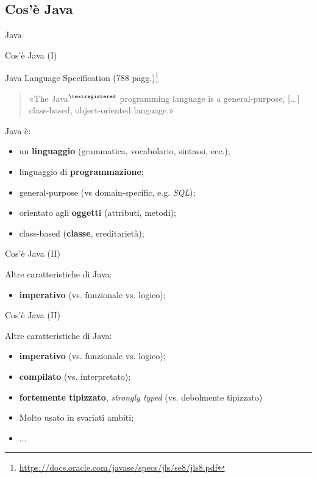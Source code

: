 \subsection[Cos'è Java]{Cos'è Java}

\begin{frame}{Java}
 
  \begin{center}
  \end{center}
  
\end{frame}

\begin{frame}{Cos'è Java (I)}
  
  Java Language Specification (788 pagg.)\footnote{\url{https://docs.oracle.com/javase/specs/jls/se8/jls8.pdf}}
  \begin{quote}
   «The Java$^{\textregistered}$  programming  language is a general-purpose, [...] 
    class-based,  object-oriented  language.»
  \end{quote}

  Java è:
  \begin{itemize}
    \item un \textbf{linguaggio} (grammatica, vocabolario, sintassi, ecc.);
    \item linguaggio di \textbf{programmazione};
    \item general-purpose (vs domain-specific, e.g. \textit{SQL});
    \item orientato agli \textbf{oggetti} (attributi, metodi);
    \item class-based (\textbf{classe}, ereditarietà);
  \end{itemize}

\end{frame}

\begin{frame}{Cos'è Java (II)}
  
  Altre caratteristiche di Java:
  \begin{itemize}
    \item \textbf{imperativo} (vs. funzionale vs. logico);
  \end{itemize}
\end{frame}

{
  
}

\begin{frame}{Cos'è Java (II)}
  
  Altre caratteristiche di Java:
  \begin{itemize}
    \item \textbf{imperativo} (vs. funzionale vs. logico);
    \item \textbf{compilato} (vs. interpretato);
    \item \textbf{fortemente tipizzato}, \emph{strongly typed} (vs. debolmente tipizzato)
    \item Molto usato in svariati ambiti;
    \item ...
  \end{itemize}
\end{frame}

